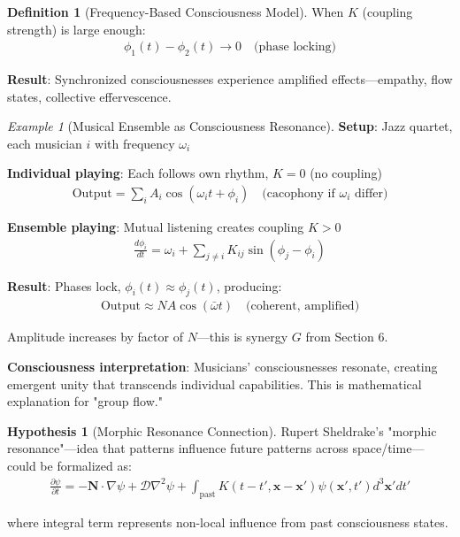 \documentclass[11pt,a4paper]{article}
\theoremstyle{definition}
\newtheorem{definition}{Definition}[section]
\newtheorem{hypothesis}{Hypothesis}[section]
\theoremstyle{remark}
\newtheorem{example}{Example}[section]
\begin{document}
\begin{enumerate}
\begin{definition}[Frequency-Based Consciousness Model]
When \(K\) (coupling strength) is large enough:
\begin{align}
\phi_1(t) - \phi_2(t) \to 0 \quad \text{(phase locking)}
\end{align}

\textbf{Result}: Synchronized consciousnesses experience amplified effects—empathy, flow states, collective effervescence.
\end{definition}

\begin{example}[Musical Ensemble as Consciousness Resonance]
\textbf{Setup}: Jazz quartet, each musician \(i\) with frequency \(\omega_i\)

\textbf{Individual playing}: Each follows own rhythm, \(K = 0\) (no coupling)
\begin{align}
\text{Output} = \sum_i A_i \cos(\omega_i t + \phi_i) \quad \text{(cacophony if } \omega_i \text{ differ)}
\end{align}

\textbf{Ensemble playing}: Mutual listening creates coupling \(K > 0\)
\begin{align}
\frac{d\phi_i}{dt} = \omega_i + \sum_{j \neq i} K_{ij}\sin(\phi_j - \phi_i)
\end{align}

\textbf{Result}: Phases lock, \(\phi_i(t) \approx \phi_j(t)\), producing:
\begin{align}
\text{Output} \approx NA\cos(\bar{\omega}t) \quad \text{(coherent, amplified)}
\end{align}

Amplitude increases by factor of \(N\)—this is synergy \(G\) from Section 6.

\textbf{Consciousness interpretation}: Musicians' consciousnesses resonate, creating emergent unity that transcends individual capabilities. This is mathematical explanation for "group flow."
\end{example}

\begin{hypothesis}[Morphic Resonance Connection]
Rupert Sheldrake's "morphic resonance"—idea that patterns influence future patterns across space/time—could be formalized as:
\begin{align}
\frac{\partial \psi}{\partial t} = -\mathbf{N} \cdot \nabla \psi + \mathcal{D}\nabla^2 \psi + \int_{\text{past}} K(t-t', \mathbf{x}-\mathbf{x}') \psi(\mathbf{x}', t') d^3\mathbf{x}' dt'
\end{align}

where integral term represents non-local influence from past consciousness states.


\end{hypothesis}
\end{enumerate}
\end{document}
